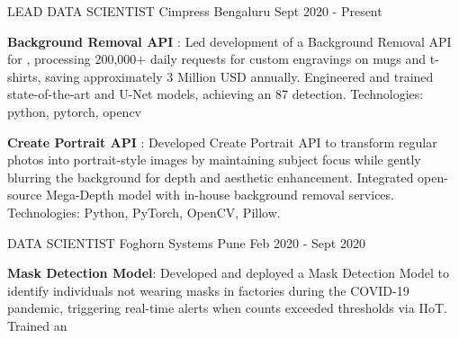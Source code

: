 
\begin{cventries}

    \cventry
    {LEAD DATA SCIENTIST} %
    {Cimpress} %
    {Bengaluru} %
    {Sept 2020 - Present} %
    {
      \begin{cvitems} %
      \item{\textbf{Background Removal API} : Led development of a Background Removal API for , processing 
      200,000+ daily requests for custom engravings on mugs and t-shirts, 
      saving approximately 3 Million USD annually. Engineered and trained 
      state-of-the-art  and 
      U-Net models, achieving an 87%
      detection. Technologies: python, pytorch, opencv }
      \item{\textbf{Create Portrait API} : Developed Create Portrait API to transform 
      regular photos into portrait-style images by maintaining subject 
      focus while gently blurring the background for depth and 
      aesthetic enhancement. Integrated open-source Mega-Depth 
      model with in-house background removal services. 
      Technologies: Python, PyTorch, OpenCV, Pillow. }
	\end{cvitems}
    }
\vspace{2em} %
  \cventry
    {DATA SCIENTIST} %
    {Foghorn Systems} %
    {Pune} %
    {Feb 2020 - Sept 2020} %
    {
      \begin{cvitems} %
        \item{\textbf{Mask Detection Model}: Developed and deployed a Mask Detection Model to 
        identify individuals not wearing masks in factories during the COVID-19 pandemic, triggering 
        real-time alerts when counts exceeded thresholds via IIoT. Trained an 
}
\end{cvitems}}
\end{cventries}
